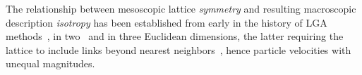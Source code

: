     The relationship between mesoscopic lattice \emph{symmetry} and resulting macroscopic description \emph{isotropy}  has  been
    established from early in the history of LGA methods~\cite{1973-HardyJ+PazzisO-JMathPhys, 1976-HardyJ+PomeauY-PhysRevA},  in
    two~\cite{1986-FrischU+PomeauY-PhysRevLett} and in three Euclidean dimensions, the latter requiring the lattice  to  include
    links  beyond  nearest  neighbors~\cite[pp.~473,490]{1986-WolframS-JStatPhys},  hence  particle  velocities   with   unequal
    magnitudes.





